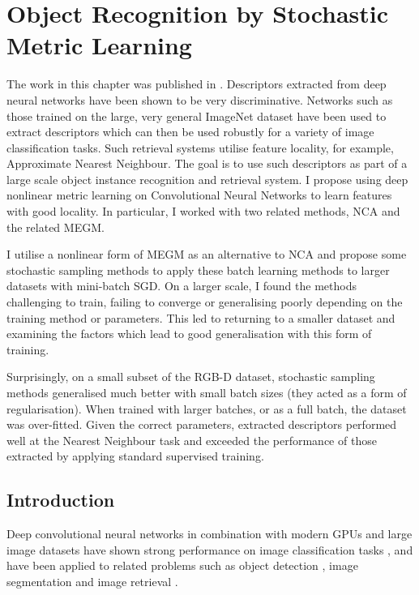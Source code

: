 
\chapter{Object Recognition by Stochastic Metric Learning}
\label{chap:metric} 

The work in this chapter was published in \cite{Batchelorc}. Descriptors extracted from deep neural networks have been shown to be very discriminative. Networks such as those trained on the large, very general ImageNet dataset have been used to extract descriptors which can then be used robustly for a variety of image classification tasks. Such retrieval systems utilise feature locality, for example, Approximate Nearest Neighbour. The goal is to use such descriptors as part of a large scale object instance recognition and retrieval system. I propose using deep nonlinear metric learning on Convolutional Neural Networks to learn features with good locality. In particular, I worked with two related methods, \gls{NCA} and the related \gls{MEGM}.

I utilise a nonlinear form of \gls{MEGM} as an alternative to \gls{NCA} and propose some stochastic sampling methods to apply these batch learning methods to larger datasets with mini-batch \gls{SGD}. On a larger scale, I found the methods challenging to train, failing to converge or generalising poorly depending on the training method or parameters. This led to returning to a smaller dataset and examining the factors which lead to good generalisation with this form of training.
  
Surprisingly, on a small subset of the RGB-D dataset, stochastic sampling methods generalised much better with small batch sizes (they acted as a form of regularisation). When trained with larger batches, or as a full batch, the dataset was over-fitted. Given the correct parameters, extracted descriptors performed well at the Nearest Neighbour task and exceeded the performance of those extracted by applying standard supervised training.

\section{Introduction}

Deep convolutional neural networks in combination with modern \gls{GPU}s and large image datasets have shown strong performance on image classification tasks \cite {Krizhevsky2012}, and have been applied to related problems such as object detection \cite{Sermanet2013}, image segmentation \cite{Masci2013} and image retrieval \cite{Razavian2014}.

